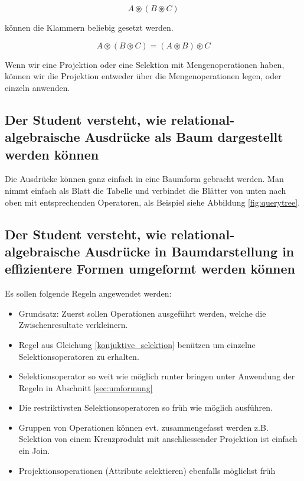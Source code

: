 \begin{equation}
  A \circledast (B \circledast C)
\end{equation}

können die Klammern beliebig gesetzt werden.

\begin{equation}
  A \circledast (B \circledast C) = (A \circledast B) \circledast C
\end{equation}


Wenn wir eine Projektion oder eine Selektion mit Mengenoperationen haben, können wir die Projektion entweder über die Mengenoperationen legen, oder einzeln anwenden.

\subsection{Der Student versteht, wie relational-algebraische Ausdrücke als Baum dargestellt werden können}
\label{sec:anfragebaum}

Die Ausdrücke können ganz einfach in eine Baumform gebracht werden. Man nimmt einfach als Blatt die Tabelle und verbindet die Blätter von unten nach oben mit entsprechenden Operatoren, als Beispiel siehe Abbildung \ref{fig:querytree}.


\subsection{Der Student versteht, wie relational-algebraische Ausdrücke in Baumdarstellung in effizientere Formen umgeformt werden können}

Es sollen folgende Regeln angewendet werden:

\begin{itemize}
  \item Grundsatz: Zuerst sollen Operationen ausgeführt werden, welche die Zwischenresultate verkleinern.
  \item Regel aus Gleichung \ref{konjuktive_selektion} benützen um einzelne Selektionsoperatoren zu erhalten.
  \item Selektionsoperator so weit wie möglich runter bringen unter Anwendung der Regeln in Abschnitt \ref{sec:umformung}
  \item Die restriktivsten Selektionsoperatoren so früh wie möglich ausführen.
  \item Gruppen von Operationen können evt. zusammengefasst werden z.B. Selektion von einem Kreuzprodukt mit anschliessender Projektion ist einfach ein Join.
  \item Projektionsoperationen (Attribute selektieren) ebenfalls möglichst früh
\end{itemize}

